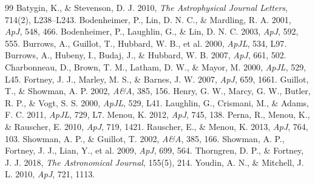\documentclass[11pt,a4paper]{article}
\begin{document}
\begin{thebibliography}{99}
 Batygin, K., \& Stevenson, D. J. 2010, \textit{The Astrophysical Journal Letters}, 714(2), L238--L243.
 Bodenheimer, P., Lin, D. N. C., \& Mardling, R. A. 2001, \textit{ApJ}, 548, 466.
 Bodenheimer, P., Laughlin, G., \& Lin, D. N. C. 2003, \textit{ApJ}, 592, 555.
 Burrows, A., Guillot, T., Hubbard, W. B., et al. 2000, \textit{ApJL}, 534, L97.
 Burrows, A., Hubeny, I., Budaj, J., \& Hubbard, W. B. 2007, \textit{ApJ}, 661, 502.
 Charbonneau, D., Brown, T. M., Latham, D. W., \& Mayor, M. 2000, \textit{ApJL}, 529, L45.
 Fortney, J. J., Marley, M. S., \& Barnes, J. W. 2007, \textit{ApJ}, 659, 1661.
 Guillot, T., \& Showman, A. P. 2002, \textit{A\&A}, 385, 156.
 Henry, G. W., Marcy, G. W., Butler, R. P., \& Vogt, S. S. 2000, \textit{ApJL}, 529, L41.
 Laughlin, G., Crismani, M., \& Adams, F. C. 2011, \textit{ApJL}, 729, L7.
 Menou, K. 2012, \textit{ApJ}, 745, 138.
 Perna, R., Menou, K., \& Rauscher, E. 2010, \textit{ApJ}, 719, 1421.
 Rauscher, E., \& Menou, K. 2013, \textit{ApJ}, 764, 103.
 Showman, A. P., \& Guillot, T. 2002, \textit{A\&A}, 385, 166.
 Showman, A. P., Fortney, J. J., Lian, Y., et al. 2009, \textit{ApJ}, 699, 564.
 Thorngren, D. P., \& Fortney, J. J. 2018, \textit{The Astronomical Journal}, 155(5), 214.
 Youdin, A. N., \& Mitchell, J. L. 2010, \textit{ApJ}, 721, 1113.
\end{thebibliography}
\end{document}
